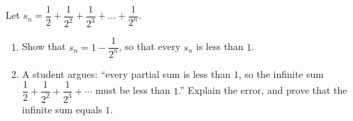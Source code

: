 Let $s_n=\dfrac{1}{2}+\dfrac{1}{2^2}+\dfrac{1}{2^3}+\dots+\dfrac{1}{2^n}$.
\begin{enumerate}
\item[(a)] Show that $s_n=1-\dfrac{1}{2^n}$, so that every $s_n$ is less than $1$.
\item[(b)] A student argues: ``every partial sum is less than $1$, so the infinite sum $\dfrac{1}{2}+\dfrac{1}{2^2}+\dfrac{1}{2^3}+\cdots$ must be less than $1$.'' Explain the error, and prove that the infinite sum equals $1$.
\end{enumerate}
